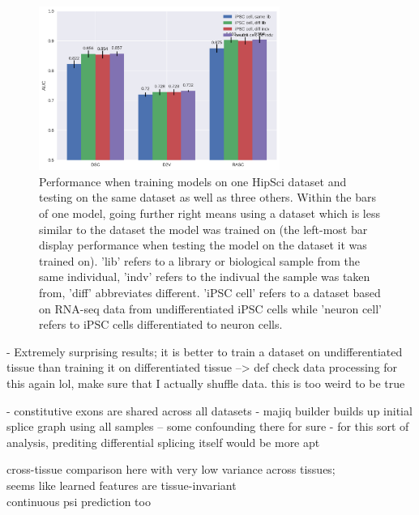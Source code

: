 \begin{figure}
	\centering\includegraphics[width=0.7\textwidth]{../visualizations/ch5-results/majiq_comparison_barcharts.png} 
	\caption{Performance when training models on one HipSci dataset and testing on the same dataset as well as three others. Within the bars of one model, going further right means using a dataset which is less similar to the dataset the model was trained on (the left-most bar display performance when testing the model on the dataset it was trained on). 'lib' refers to a library or biological sample from the same individual, 'indv' refers to the indivual the sample was taken from, 'diff' abbreviates different. 'iPSC cell' refers to a dataset based on RNA-seq data from undifferentiated iPSC cells while 'neuron cell' refers to iPSC cells differentiated to neuron cells. }
	\label{fig:majiq_comparison_barcharts}
\end{figure}

- Extremely surprising results; it is better to train a dataset on undifferentiated tissue than training it on differentiated tissue --> def check data processing for this again lol, make sure that I actually shuffle data. this is too weird to be true

- constitutive exons are shared across all datasets
- majiq builder builds up initial splice graph using all samples -- some confounding there for sure
- for this sort of analysis, prediting differential splicing itself would be more apt

cross-tissue comparison here with very low variance across tissues;\\
seems like learned features are tissue-invariant\\

continuous psi prediction too

